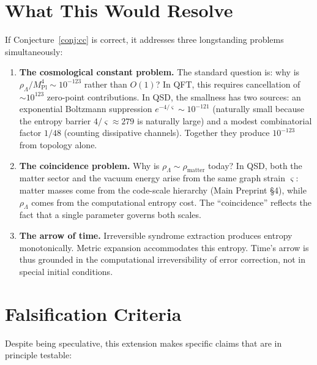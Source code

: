 \documentclass[11pt,a4paper]{article}
\theoremstyle{definition}
\newcommand{\gs}{\varsigma}                %
\newcommand{\Mpl}{M_{\text{Pl}}}
\newcommand{\rhoL}{\rho_{\Lambda}}
\begin{document}
\section{What This Would Resolve}

If Conjecture~\ref{conj:cc} is correct, it addresses three longstanding problems simultaneously:

\begin{enumerate}
    \item \textbf{The cosmological constant problem.} The standard question is: why is $\rhoL/\Mpl^4 \sim 10^{-123}$ rather than $O(1)$? In QFT, this requires cancellation of $\sim 10^{123}$ zero-point contributions. In QSD, the smallness has two sources: an exponential Boltzmann suppression $e^{-4/\gs} \sim 10^{-121}$ (naturally small because the entropy barrier $4/\gs \approx 279$ is naturally large) and a modest combinatorial factor $1/48$ (counting dissipative channels). Together they produce $10^{-123}$ from topology alone.

    \item \textbf{The coincidence problem.} Why is $\rhoL \sim \rho_{\text{matter}}$ today? In QSD, both the matter sector and the vacuum energy arise from the same graph strain $\gs$: matter masses come from the code-scale hierarchy (Main Preprint \S4), while $\rhoL$ comes from the computational entropy cost. The ``coincidence'' reflects the fact that a single parameter governs both scales.

    \item \textbf{The arrow of time.} Irreversible syndrome extraction produces entropy monotonically. Metric expansion accommodates this entropy. Time's arrow is thus grounded in the computational irreversibility of error correction, not in special initial conditions.
\end{enumerate}


\section{Falsification Criteria}

Despite being speculative, this extension makes specific claims that are in principle testable:
\end{document}

